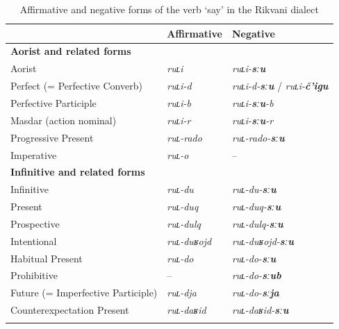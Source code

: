 \documentclass[output=paper,colorlinks=true, citecolor=brown]{langscibook}
\begin{document}
\begin{table}
\begin{tabularx}{\textwidth}{Xll} 
\lsptoprule
& {Affirmative} & {Negative}\\
\midrule
\textbf{Aorist and related forms} &  & \\
\midrule
Aorist & \textit{ruʟi} & \textit{ruʟi-\textbf{sːu}}\\
Perfect (= Perfective Converb) & \textit{ruʟi{}-d} & \textit{ruʟi{}-d{}-\textbf{sːu}} / \textit{ruʟi{}-\textbf{č’igu}} \\
Perfective Participle & \textit{ruʟi{}-b} & \textit{ruʟi{}-\textbf{sːu}{}-b} \\
Masdar (action nominal) & \textit{ruʟi{}-r} & \textit{ruʟi{}-\textbf{sːu}{}-r} \\
Progressive Present & \textit{ruʟ-rado} & \textit{ruʟ-rado-\textbf{sːu}} \\
Imperative & \textit{ruʟ-o} & –\\
\tablevspace
\textbf{Infinitive and related forms} &  & \\
\midrule 
Infinitive & \textit{ruʟ-du} & \textit{ruʟ-du-\textbf{sːu}} \\
Present & \textit{ruʟ{}-duq} & \textit{ruʟ{}-duq{}-\textbf{sːu}} \\
Prospective & \textit{ruʟ-dulq} & \textit{ruʟ-dulq-\textbf{sːu}} \\
Intentional & \textit{ruʟ{}-duʁojd} & \textit{ruʟ{}-duʁojd{}-\textbf{sːu}} \\
Habitual Present & \textit{ruʟ-do} & \textit{ruʟ-do-\textbf{sːu}} \\
Prohibitive & – & \textit{ruʟ-do-\textbf{sːub}} \\
Future (= Imperfective Participle) & \textit{ruʟ-dja} & \textit{ruʟ-do-\textbf{sːja}} \\
Counterexpectation Present & \textit{ruʟ{}-daʁid} & \textit{ruʟ{}-daʁid{}-\textbf{sːu}} \\
\lspbottomrule
\end{tabularx}
\caption{Affirmative and negative forms of the verb ‘say’ in the Rikvani dialect}
\label{tab:and:1}
\end{table}
\end{document}
